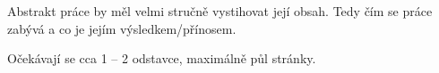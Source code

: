 \documentclass[11pt,twoside,a4paper]{book}
\begin{document}
	\noindent
	Abstrakt práce by měl velmi stručně vystihovat její obsah. Tedy čím se práce zabývá a co je jejím výsledkem/přínosem.

	\noindent
	Očekávají se cca 1 -- 2 odstavce, maximálně půl stránky.

	\tableofcontents		%

	\listoffigures			%
	\listoftables			%

	\mainbodystarts







%
%


%




%
{
\def\CS{$\cal C\kern-0.1667em\lower.5ex\hbox{$\cal S$}\kern-0.075em $}

}

%


\appendix	

\printnomenclature
\label{apx:zkratky}
\end{document}
